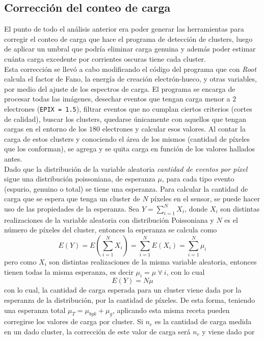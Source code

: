 \subsection{Corrección del conteo de carga}
\noindent El punto de todo el análisis anterior era poder generar las herramientas para corregir el conteo de carga que hace el programa de detección de clusters, luego de aplicar un umbral que podría eliminar carga genuina y además poder estimar cuánta carga excedente por corrientes oscuras tiene cada cluster.\\
\indent Esta corrección se llevó a cabo modificando el código del programa que con \textit{Root} calcula el factor de Fano, la energía de creación electrón-hueco, y otras variables, por medio del ajuste de los espectros de carga. El programa se encarga de procesar todas las imágenes, desechar eventos que tengan carga menor a $2$ electrones (\verb|EPIX = 1.5|), filtrar eventos que no cumplan ciertos criterios (cortes de calidad), buscar los clusters, quedarse únicamente con aquellos que tengan cargas en el entorno de los $180$ electrones y calcular esos valores. Al contar la carga de estos clusters y conociendo el área de los mismos (cantidad de píxeles que los conforman), se agrega y se quita carga en función de los valores hallados antes.\\
\indent Dado que la distribución de la variable aleatoria \textit{cantidad de eventos por píxel} sigue una distribución poissoniana, de esperanza $\mu$, para cada tipo evento (espurio, genuino o total) se tiene una esperanza. Para calcular la cantidad de carga que se espera que tenga un cluster de $N$ píxeles en el sensor, se puede hacer uso de las propiedades de la esperanza. Sea $Y = \sum\limits_{i = 1}^{N} X_{i}$, donde $X_{i}$ son distintas realizaciones de la variable aleatoria con distribución Poissoniana y $N$ es el número de píxeles del cluster, entonces la esperanza se calcula como
\begin{equation*}
    E(Y) = 
    E
    \left(
        \sum\limits_{i=1}^{N} X_{i}
    \right)
    = \sum\limits_{i=1}^{N}E(X_{i})
    = \sum\limits_{i=1}^{N}\mu_{i}
\end{equation*}
pero como $X_{i}$ son distintas realizaciones de la misma variable aleatoria, entonces tienen todas la misma esperanza, es decir $\mu_{i} = \mu\ \forall\ i$, con lo cual
\begin{equation*}
    E(Y) = N\mu
\end{equation*}
con lo cual, la cantidad de carga esperada para un cluster viene dada por la esperanza de la distribución, por la cantidad de píxeles. De esta forma, teniendo una esperanza total $\mu_{T} = \mu_{bgk} + \mu_{g}$, aplicando esta misma receta pueden corregirse los valores de carga por cluster. Si $n_{e}$ es la cantidad de carga medida en un dado cluster, la corrección de este valor de carga será $n_{c}$ y viene dado por
